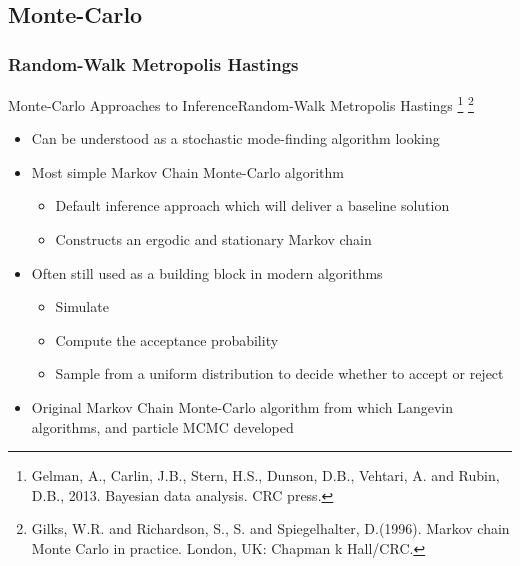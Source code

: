 \documentclass[AERbeamer%
              ,optEnglish%
              ,optBiber%
              ,optBibstyleAlphabetic%
              ,optBeamerClassicFormat%
              ]{AERlatex}%
\begin{document}
\subsection{Monte-Carlo}



\subsubsection*{Random-Walk Metropolis Hastings}
\begin{frame}[c]{Monte-Carlo Approaches to Inference}{Random-Walk Metropolis Hastings \footnote{Gelman, A., Carlin, J.B., Stern, H.S., Dunson, D.B., Vehtari, A. and Rubin,
                                                                                                D.B., 2013. Bayesian data analysis. CRC press.}
                                                                                      \footnote{Gilks, W.R. and Richardson, S., S. and Spiegelhalter, D.(1996). Markov chain
                                                                                                Monte Carlo in practice. London, UK: Chapman k Hall/CRC.}}
    \centering
    \begin{itemize}
        \item Can be understood as a stochastic mode-finding algorithm looking
        \item Most simple Markov Chain Monte-Carlo algorithm
        \begin{itemize}
            \item Default inference approach which will deliver a baseline solution
            \item Constructs an ergodic and stationary Markov chain
        \end{itemize}
        \item Often still used as a building block in modern algorithms
        \begin{itemize}
            \item Simulate
            \item Compute the acceptance probability
            \item Sample from a uniform distribution to decide whether to accept or reject
        \end{itemize}
        \item Original Markov Chain Monte-Carlo algorithm from which Langevin algorithms, and particle MCMC developed
    \end{itemize}
\end{frame}
\end{document}
